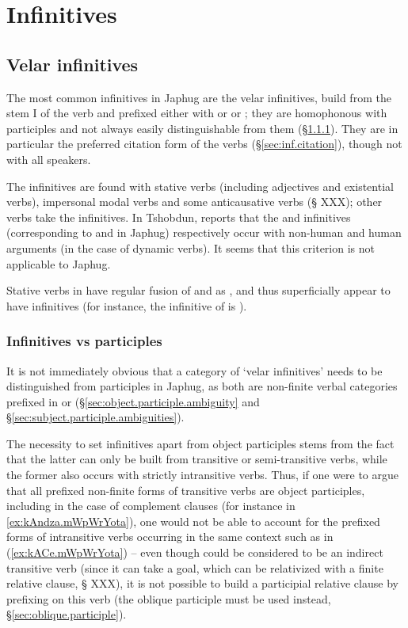 \section{Infinitives}

 
\subsection{Velar infinitives} \label{sec:velar.inf}
The most common infinitives in Japhug are the velar infinitives, build from the stem I of the verb and prefixed either with  or or ; they are homophonous with participles and not always easily distinguishable from them (§\ref{sec:infinitives.participles}). They are in particular the preferred citation form of the verbs (§\ref{sec:inf.citation}), though not with all speakers.
 
The  infinitives are found with stative verbs (including adjectives and existential verbs), impersonal modal verbs and some anticausative verbs (§ XXX); other verbs take the  infinitives. In Tshobdun, \citet[235]{sun14generic} reports that the  and  infinitives (corresponding to  and  in Japhug) respectively occur with non-human and human arguments (in the case of dynamic verbs). It seems that this criterion is not applicable to Japhug.

Stative verbs in  have regular fusion of  and  as , and thus superficially appear to have  infinitives (for instance, the infinitive of  is  ).

\subsubsection{Infinitives vs participles} \label{sec:infinitives.participles}
It is not immediately obvious that a category of `velar infinitives' needs to be distinguished from participles in Japhug, as both are non-finite verbal categories prefixed in  or  (§\ref{sec:object.participle.ambiguity} and §\ref{sec:subject.participle.ambiguities}). 

The necessity to set  infinitives apart from object participles stems from the fact that the latter can only be built from transitive or semi-transitive verbs, while the former also occurs with strictly intransitive verbs. Thus, if one were to argue that all prefixed non-finite forms of transitive verbs are object participles, including in the case of complement clauses (for instance  in \ref{ex:kAndza.mWpWrYota}), one would not be able to account for the prefixed forms of intransitive verbs occurring in the same context such as  in (\ref{ex:kACe.mWpWrYota}) -- even though  could be considered to be an indirect transitive verb (since it can take a goal, which can be relativized with a finite relative clause, § XXX), it is not possible to build a participial relative clause by prefixing  on this verb (the oblique participle  must be used instead, §\ref{sec:oblique.participle}).


